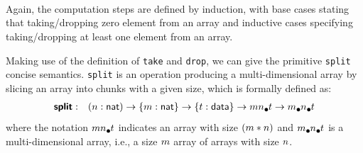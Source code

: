 \documentclass{l4proj}
\begin{document}
\begin{code}%
\>[0]\<%
\\
\>[0]\AgdaSpace{}%
\AgdaSymbol{:}\AgdaSpace{}%
\AgdaSymbol{(}\AgdaSpace{}%
\AgdaSymbol{:}\AgdaSpace{}%
\AgdaSymbol{)}\AgdaSpace{}%
\AgdaSpace{}%
\AgdaSymbol{\{}\AgdaSpace{}%
\AgdaSymbol{:}\AgdaSpace{}%
\AgdaSymbol{\}}\AgdaSpace{}%
\AgdaSpace{}%
\AgdaSymbol{\{}\AgdaSpace{}%
\AgdaSymbol{:}\AgdaSpace{}%
\AgdaSymbol{\}}\AgdaSpace{}%
\AgdaSpace{}%
\AgdaSpace{}%
\AgdaSpace{}%
\AgdaSymbol{(}\AgdaSpace{}%
\AgdaOperator{\AgdaPrimitive{+}}\AgdaSpace{}%
\AgdaSymbol{)}\AgdaSpace{}%
\AgdaSpace{}%
\AgdaSpace{}%
\AgdaSpace{}%
\<%
\\
\>[0]\AgdaSpace{}%
\AgdaSpace{}%
\AgdaSpace{}%
\AgdaSymbol{=}\AgdaSpace{}%
\<%
\\
\>[0]\AgdaSpace{}%
\AgdaSymbol{(}\AgdaSpace{}%
\AgdaSymbol{)}\AgdaSpace{}%
\AgdaSymbol{(}\AgdaSpace{}%
\AgdaSpace{}%
\AgdaSymbol{)}\AgdaSpace{}%
\AgdaSymbol{=}\AgdaSpace{}%
\AgdaSpace{}%
\AgdaSpace{}%
\<%
\end{code}
\newpage %
Again, the computation steps are defined by induction, with base cases stating that taking/dropping zero element from an array and inductive cases specifying taking/dropping at least one element from an array.

Making use of the definition of \texttt{take} and \texttt{drop}, we can give the primitive \texttt{split} concise semantics. \texttt{split} is an operation producing a multi-dimensional array by slicing an array into chunks with a given size, which is formally defined as:
\begin{align}
    \label{lift:split}
    \prim{split}&:&(\n : \natkind) \to \{\m : \natkind\} \to \{\dt : \datatype\} \to \lArray{\m\n}{\dt} \to \lArray{\m}{\lArray{\n}{\dt}}
\end{align}
where the notation $\lArray{\m\n}{\dt}$ indicates an array with size $(m * n)$ and $\lArray{\m}{\lArray{\n}{\dt}}$ is a multi-dimensional array, i.e., a size $m$ array of arrays with size $n$.
\end{document}
